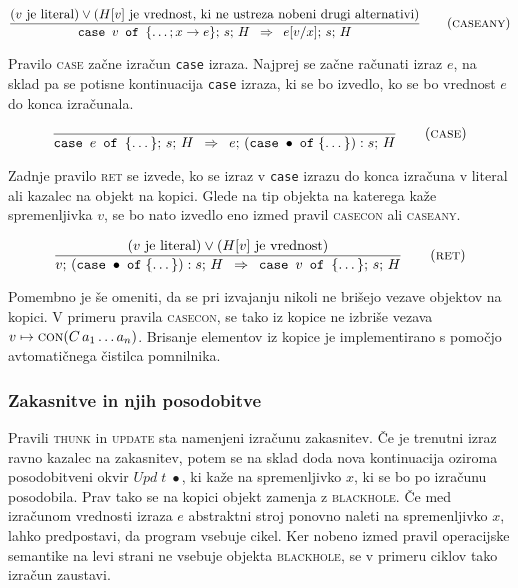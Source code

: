 \begin{equation}
	\infer[caseany]{
		(\text{$v$ je literal}) \lor (\text{$H[v]$ je vrednost, ki ne ustreza nobeni drugi alternativi})
	}{
		\texttt{case} \enspace v \enspace \texttt{of} \enspace \{ \dots; x \to e \}; \, s; \, H
	}{
		e[v/x]; \, s; \, H
	}
\end{equation}

Pravilo \textsc{case} začne izračun \texttt{case} izraza. Najprej se začne računati izraz $e$, na sklad pa se potisne kontinuacija \texttt{case} izraza, ki se bo izvedlo, ko se bo vrednost $e$ do konca izračunala.

\begin{equation}
	\infer[case]{}{
		\texttt{case} \enspace e \enspace \texttt{of} \enspace \{ \dots \}; \, s; \, H
	}{
		e; \, (\texttt{case} \; \bullet \; \texttt{of} \; \{ \dots \}) : s; \, H
	}
\end{equation}

Zadnje pravilo \textsc{ret} se izvede, ko se izraz v \texttt{case} izrazu do konca izračuna v literal ali kazalec na objekt na kopici. Glede na tip objekta na katerega kaže spremenljivka $v$, se bo nato izvedlo eno izmed pravil \textsc{casecon} ali \textsc{caseany}.

\begin{equation}
	\infer[ret]{
		(\text{$v$ je literal}) \lor (\text{$H[v]$ je vrednost})
	}{
		v; \, (\texttt{case} \; \bullet \; \texttt{of} \; \{ \dots \}) : s; \, H
	}{
		\texttt{case} \enspace v \enspace \texttt{of} \enspace \{ \dots \}; \, s; \, H
	}
\end{equation}

Pomembno je še omeniti, da se pri izvajanju nikoli ne brišejo vezave objektov na kopici. V primeru pravila \textsc{casecon}, se tako iz kopice ne izbriše vezava $v \mapsto \textsc{con}(C \, a_1 \dots a_n)$. Brisanje elementov iz kopice je implementirano s pomočjo avtomatičnega čistilca pomnilnika.

\subsubsection{Zakasnitve in njih posodobitve}

Pravili \textsc{thunk} in \textsc{update} sta namenjeni izračunu zakasnitev. Če je trenutni izraz ravno kazalec na zakasnitev, potem se na sklad doda nova kontinuacija oziroma posodobitveni okvir $\textit{Upd} \; t \; \bullet$, ki kaže na spremenljivko $x$, ki se bo po izračunu posodobila. Prav tako se na kopici objekt zamenja z \textsc{blackhole}. Če med izračunom vrednosti izraza $e$ abstraktni stroj ponovno naleti na spremenljivko $x$, lahko predpostavi, da program vsebuje cikel. Ker nobeno izmed pravil operacijske semantike na levi strani ne vsebuje objekta \textsc{blackhole}, se v primeru ciklov tako izračun zaustavi.


